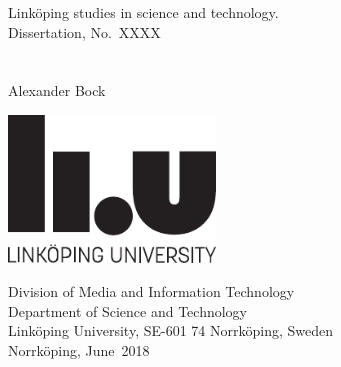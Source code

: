 \setbirthplace{~}
\phden
{}

\def\fronttitleM{\thesistitle}
\def\fronttitleS{~}
\renewcommand{\author}{\thesisauthor} %
\newcommand{\thesismonth}{June}
\newcommand{\thesisyear}{2018}
\newcommand{\thesisno}{XXXX}
\newcommand{\isbn}{ISBN: 978-91-7685-291-0}
\newcommand{\issn}{ISSN: 0345-7524}


\thispagestyle{empty}

\makeatletter
\begin{center}
  \large Link{\"o}ping studies in science and technology.\\
  Dissertation, No.\ \thesisno\\[8 mm]
  {\large \MakeUppercase{\fronttitleM}}\\[1 mm]
  {\large \textit{\fronttitleS}}\\[8 mm]
  {\large Alexander Bock}\\[1 cm]
\end{center}
\vfill \vspace{2cm}
\centerline{\includegraphics[width=5.5cm]{figures/logo/linkuniv_staende_eng}}
\vfill
\begin{center}
\end{center}
\vfill
\begin{center}
  Division of Media and Information Technology\\
  Department of Science and Technology\\
  Link{\"o}ping University, SE-601 74 Norrk{\"o}ping, Sweden\\[0mm]
  Norrk{\"o}ping, \thesismonth~\thesisyear
\end{center}

\clearpage